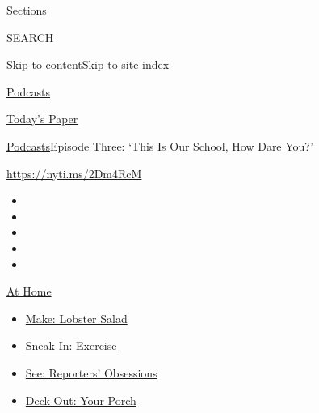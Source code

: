 Sections

SEARCH

\protect\hyperlink{site-content}{Skip to
content}\protect\hyperlink{site-index}{Skip to site index}

\href{https://www.nytimes3xbfgragh.onion/spotlight/podcasts}{Podcasts}

\href{https://myaccount.nytimes3xbfgragh.onion/auth/login?response_type=cookie\&client_id=vi}{}

\href{https://www.nytimes3xbfgragh.onion/section/todayspaper}{Today's
Paper}

\href{/spotlight/podcasts}{Podcasts}\textbar{}Episode Three: `This Is
Our School, How Dare You?'

\url{https://nyti.ms/2Dm4RcM}

\begin{itemize}
\item
\item
\item
\item
\item
\end{itemize}

\href{https://www.nytimes3xbfgragh.onion/spotlight/at-home?action=click\&pgtype=Article\&state=default\&region=TOP_BANNER\&context=at_home_menu}{At
Home}

\begin{itemize}
\tightlist
\item
  \href{https://www.nytimes3xbfgragh.onion/2020/08/14/dining/lobster-salad-recipe.html?action=click\&pgtype=Article\&state=default\&region=TOP_BANNER\&context=at_home_menu}{Make:
  Lobster Salad}
\item
  \href{https://www.nytimes3xbfgragh.onion/2020/08/15/at-home/coronavirus-at-home-quick-exercises.html?action=click\&pgtype=Article\&state=default\&region=TOP_BANNER\&context=at_home_menu}{Sneak
  In: Exercise}
\item
  \href{https://www.nytimes3xbfgragh.onion/interactive/2020/at-home/even-more-reporters-editors-diaries-lists-recommendations.html?action=click\&pgtype=Article\&state=default\&region=TOP_BANNER\&context=at_home_menu}{See:
  Reporters' Obsessions}
\item
  \href{https://www.nytimes3xbfgragh.onion/2020/08/15/at-home/coronavirus-fall-patio-furniture.html?action=click\&pgtype=Article\&state=default\&region=TOP_BANNER\&context=at_home_menu}{Deck
  Out: Your Porch}
\end{itemize}

